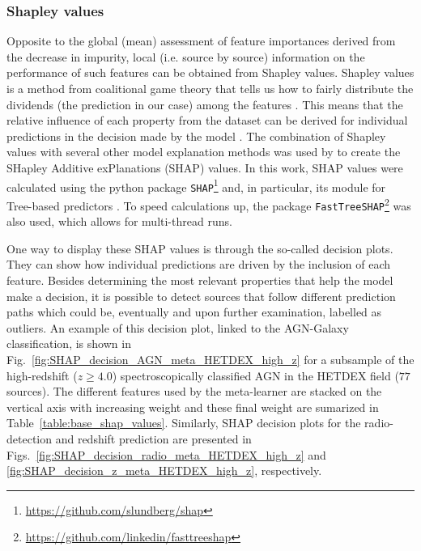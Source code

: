 \documentclass{aa}
\begin{document}
\subsubsection{Shapley values}\label{sec:shapley_values}

Opposite to the global (mean) assessment of feature importances derived from the decrease in impurity, local (i.e. source by source) information on the performance of such features can be obtained from Shapley values. Shapley values is a method from coalitional game theory that tells us how to fairly distribute the dividends (the prediction in our case) among the features \citep{Shapley_article}. This means that the relative influence of each property from the dataset can be derived for individual predictions in the decision made by the model \citep[which is not the same as obtaining causal correlations between features and the target;][]{2020arXiv200805052M}. 
The combination of Shapley values with several other model explanation methods  was used by \citet[][]{NIPS2017_7062} to create the SHapley Additive exPlanations (SHAP) values. In this work, SHAP values were calculated using the python package \verb|SHAP|\footnote{\url{https://github.com/slundberg/shap}} and, in particular, its module for Tree-based predictors \citep{lundberg2020local2global}.
To speed calculations up, the package \verb|FastTreeSHAP|\footnote{\url{https://github.com/linkedin/fasttreeshap}} \citep[\texttt{v0.1.2};][]{2021arXiv210909847Y} was also used, which allows for multi-thread runs. 


One way to display these SHAP values is through the so-called decision plots. They can show how individual predictions are driven by the inclusion of each feature. Besides determining the most relevant properties that help the model make a decision, it is possible to detect sources that follow different prediction paths which could be, eventually and upon further examination, labelled as outliers. An example of this decision plot, linked to the AGN-Galaxy classification, is shown in Fig.~\ref{fig:SHAP_decision_AGN_meta_HETDEX_high_z} for a subsample of the high-redshift (${z \geq 4.0}$) spectroscopically classified AGN in the HETDEX field ($77$ sources). The different features used by the meta-learner are stacked on the vertical axis with increasing weight and these final weight are sumarized in Table~\ref{table:base_shap_values}. Similarly, SHAP decision plots for the radio-detection and redshift prediction are presented in Figs.~\ref{fig:SHAP_decision_radio_meta_HETDEX_high_z} and \ref{fig:SHAP_decision_z_meta_HETDEX_high_z}, respectively.
\end{document}
